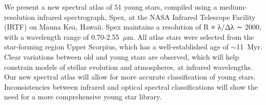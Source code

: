 We present a new spectral atlas of 51 young stars, compiled using a medium-resolution infrared spectrograph, Spex, at the NASA Infrared Telescope Facility (IRTF) on Mauna Kea, Hawaii.  
Spex maintains a resolution of R ≡ λ/Δλ ∼ 2000, with a wavelength range of 0.70-2.55~$\mu$m. 
All atlas stars were selected from the star-forming region Upper Scorpius, which has a well-established age of $\sim$11~Myr. Clear variations between old and young stars are observed, which will help constrain models of stellar evolution and atmospheres, at infrared wavelengths. Our new spectral atlas will allow for more accurate classification of young stars.  Inconsistencies between infrared and optical spectral classifications will show the need for a more comprehensive young star library.